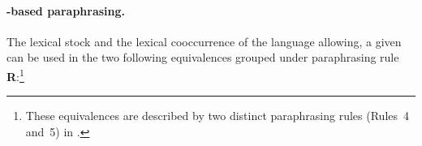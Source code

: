 \paragraph*{-based paraphrasing.}\label{par:GenerBasedParaphrasing}

The lexical stock and the lexical cooccurrence of the language allowing, a given  can be used in the two following equivalences grouped under paraphrasing rule \textbf{R}:\footnote{These equivalences are described by two distinct paraphrasing rules (Rules~4 and~5) in \textcite[p.]{Melcuk2013c-e}.}

\begin{center}
\label{txt:RParaphGener}
\end{center}
